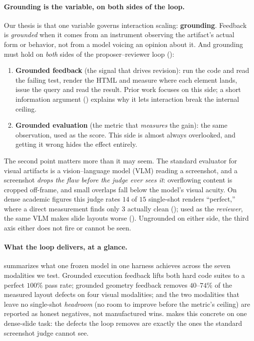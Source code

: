 \paragraph{Grounding is the variable, on both sides of the loop.} Our thesis is that one variable governs interaction scaling: \textbf{grounding}. Feedback is \emph{grounded} when it comes from an instrument observing the artifact's actual form or behavior, not from a model voicing an opinion about it. And grounding must hold on \emph{both} sides of the proposer--reviewer loop ():
\begin{enumerate}[leftmargin=1.4em,itemsep=1pt,topsep=2pt]
\item \textbf{Grounded feedback} (the signal that drives revision): run the code and read the failing test, render the HTML and measure where each element lands, issue the query and read the result. Prior work focuses on this side; a short information argument () explains why it lets interaction break the internal ceiling.
\item \textbf{Grounded evaluation} (the metric that \emph{measures} the gain): the same observation, used as the score. This side is almost always overlooked, and getting it wrong hides the effect entirely.
\end{enumerate}
The second point matters more than it may seem. The standard evaluator for visual artifacts is a vision--language model (VLM) reading a screenshot, and a screenshot \emph{drops the flaw before the judge ever sees it}: overflowing content is cropped off-frame, and small overlaps fall below the model's visual acuity. On dense academic figures this judge rates $14$ of $15$ single-shot renders ``perfect,'' where a direct measurement finds only $3$ actually clean (); used as the \emph{reviewer}, the same VLM makes slide layouts worse (). Ungrounded on either side, the third axis either does not fire or cannot be seen.

\paragraph{What the loop delivers, at a glance.}  summarizes what one frozen model in one harness achieves across the seven modalities we test. Grounded execution feedback lifts both hard code suites to a perfect $100\%$ pass rate; grounded geometry feedback removes $40$--$74\%$ of the measured layout defects on four visual modalities; and the two modalities that leave no single-shot \emph{headroom} (no room to improve before the metric's ceiling) are reported as honest negatives, not manufactured wins.  makes this concrete on one dense-slide task: the defects the loop removes are exactly the ones the standard screenshot judge cannot see.

